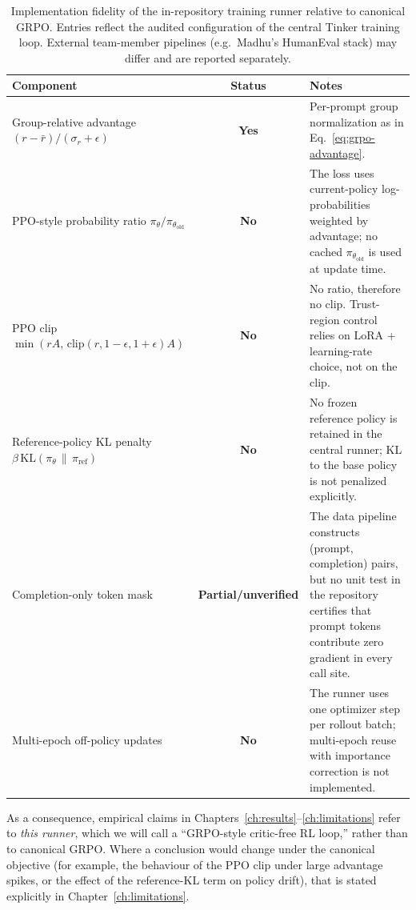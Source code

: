 \documentclass[12pt,a4paper]{report}
\begin{document}
\begin{table}[ht]
\centering
\small
\caption{Implementation fidelity of the in-repository training runner relative to canonical GRPO. Entries reflect the audited configuration of the central Tinker training loop. External team-member pipelines (e.g.\ Madhu's HumanEval stack) may differ and are reported separately.}
\label{tab:grpo-fidelity}
\footnotesize
\begin{tabularx}{\textwidth}{lcX}
\toprule
Component & Status & Notes \\
\midrule
Group-relative advantage $(r-\bar r)/(\sigma_r+\epsilon)$ & \textbf{Yes} & Per-prompt group normalization as in Eq.~\eqref{eq:grpo-advantage}. \\
PPO-style probability ratio $\pi_\theta/\pi_{\theta_{\mathrm{old}}}$ & \textbf{No} & The loss uses current-policy log-probabilities weighted by advantage; no cached $\pi_{\theta_{\mathrm{old}}}$ is used at update time. \\
PPO clip $\min(r A,\,\mathrm{clip}(r,1\!-\!\epsilon,1\!+\!\epsilon)A)$ & \textbf{No} & No ratio, therefore no clip. Trust-region control relies on LoRA + learning-rate choice, not on the clip. \\
Reference-policy KL penalty $\beta\,\mathrm{KL}(\pi_\theta\,\|\,\pi_{\mathrm{ref}})$ & \textbf{No} & No frozen reference policy is retained in the central runner; KL to the base policy is not penalized explicitly. \\
Completion-only token mask & \textbf{Partial/unverified} & The data pipeline constructs (prompt, completion) pairs, but no unit test in the repository certifies that prompt tokens contribute zero gradient in every call site. \\
Multi-epoch off-policy updates & \textbf{No} & The runner uses one optimizer step per rollout batch; multi-epoch reuse with importance correction is not implemented. \\
\bottomrule
\end{tabularx}
\end{table}

As a consequence, empirical claims in Chapters~\ref{ch:results}--\ref{ch:limitations} refer to \emph{this runner}, which we will call a ``GRPO-style critic-free RL loop,'' rather than to canonical GRPO. Where a conclusion would change under the canonical objective (for example, the behaviour of the PPO clip under large advantage spikes, or the effect of the reference-KL term on policy drift), that is stated explicitly in Chapter~\ref{ch:limitations}.
\end{document}
